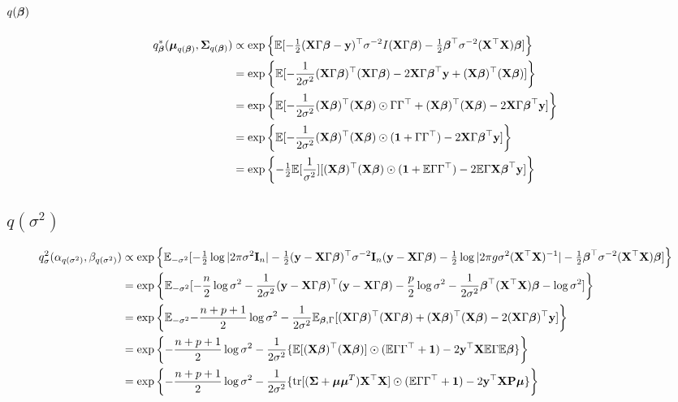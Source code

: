 \documentclass{amsart}[12pt]
\begin{document}
\subsection{$q({\boldsymbol \beta})$}
\begin{align*}
q_{\boldsymbol \beta}^*({\boldsymbol \mu}_{q({\boldsymbol \beta})}, {\boldsymbol \Sigma}_{q({\boldsymbol \beta})}) &\propto \exp \left\{ \mathbb{E}[-\tfrac{1}{2} ({\bf X} \Gamma {\boldsymbol\beta} - {\bf y})^\top \sigma^{-2} I ({\bf X} \Gamma {\boldsymbol\beta}) - \tfrac{1}{2} {\boldsymbol \beta}^\top \sigma^{-2} ({\bf X}^\top {\bf X}) {\boldsymbol \beta}] \right\} \\
&= \exp \left\{ \mathbb{E}[-\frac{1}{2 \sigma^2} ({\bf X} \Gamma {\boldsymbol\beta})^\top ({\bf X} \Gamma {\boldsymbol\beta}) - 2 {\bf X} \Gamma {\boldsymbol\beta}^\top {\bf y} + ({\bf X} {\boldsymbol \beta})^\top ({\bf X} {\boldsymbol \beta})] \right\} \\
&= \exp \left\{ \mathbb{E}[-\frac{1}{2 \sigma^2} ({\bf X} {\boldsymbol \beta})^\top ({\bf X} {\boldsymbol \beta}) \odot \Gamma \Gamma^\top + ({\bf X} {\boldsymbol \beta})^\top ({\bf X} {\boldsymbol \beta}) - 2 {\bf X} \Gamma {\boldsymbol\beta}^\top {\bf y}] \right\} \\
&= \exp \left\{ \mathbb{E}[-\frac{1}{2 \sigma^2} ({\bf X} {\boldsymbol \beta})^\top ({\bf X} {\boldsymbol \beta}) \odot ({\bf 1} + \Gamma \Gamma^\top) - 2 {\bf X} \Gamma {\boldsymbol\beta}^\top {\bf y}] \right\} \\
&= \exp \left\{ -\tfrac{1}{2} \mathbb{E}[\frac{1}{\sigma^2}] [({\bf X} {\boldsymbol \beta})^\top ({\bf X} {\boldsymbol \beta}) \odot ({\bf 1} + \mathbb{E} \Gamma \Gamma^\top) - 2 \mathbb{E} \Gamma {\bf X} {\boldsymbol\beta}^\top {\bf y}] \right\}
\end{align*}

\subsection{$q(\sigma^2)$}
\begin{align*}
q_\sigma^2(\alpha_{q(\sigma^2)}, \beta_{q(\sigma^2)}) &\propto \exp \left\{ \mathbb{E}_{-\sigma^2} [-\tfrac{1}{2} \log |2 \pi \sigma^2 {\bf I}_n| - \tfrac{1}{2} ({\bf y} - {\bf X} \Gamma {\boldsymbol\beta})^\top \sigma^{-2} {\bf I}_n ({\bf y} - {\bf X} \Gamma {\boldsymbol\beta}) - \tfrac{1}{2} \log |2 \pi g \sigma^2 ({\bf X}^\top {\bf X})^{-1}| - \tfrac{1}{2} {\boldsymbol \beta}^\top \sigma^{-2} ({\bf X}^\top {\bf X}) {\boldsymbol \beta}]  \right\} \\
&= \exp \left\{ \mathbb{E}_{-\sigma^2} [- \frac{n}{2} \log \sigma^2 - \frac{1}{2 \sigma^2}({\bf y} - {\bf X} \Gamma {\boldsymbol\beta})^\top({\bf y} - {\bf X} \Gamma {\boldsymbol\beta}) - \frac{p}{2} \log \sigma^2 - \frac{1}{2 \sigma^2} {\boldsymbol \beta}^\top ({\bf X}^\top {\bf X}) {\boldsymbol \beta} - \log \sigma^2]  \right\} \\
&= \exp \left\{ \mathbb{E}_{-\sigma^2} {-\frac{n + p + 1}{2} \log \sigma^2 - \frac{1}{2\sigma^2} \mathbb{E}_{{\boldsymbol \beta}, \Gamma} [({\bf X} \Gamma {\boldsymbol\beta})^\top ({\bf X} \Gamma {\boldsymbol\beta}) + ({\bf X} {\boldsymbol \beta})^\top ({\bf X} {\boldsymbol \beta}) - 2 ({\bf X} \Gamma {\boldsymbol\beta})^\top {\bf y}]}  \right\} \\
&= \exp \left\{ -\frac{n + p + 1}{2} \log \sigma^2 - \frac{1}{2 \sigma^2} \{\mathbb{E} [({\bf X} {\boldsymbol \beta})^\top ({\bf X} {\boldsymbol \beta})] \odot (\mathbb{E} \Gamma \Gamma^\top + {\bf 1}) - 2{\bf y}^\top {\bf X} \mathbb{E} \Gamma \mathbb{E} {\boldsymbol \beta}\} \right\} \\
&= \exp \left\{ -\frac{n + p + 1}{2} \log \sigma^2 - \frac{1}{2 \sigma^2} \{\text{tr}[({\boldsymbol \Sigma} + {\boldsymbol \mu} {\boldsymbol \mu}^T) {\bf X}^\top {\bf X}] \odot (\mathbb{E} \Gamma \Gamma^\top + {\bf 1}) - 2{\bf y}^\top {\bf X} {\bf P} {\boldsymbol\mu}\} \right\} \\
\end{align*}
\end{document}
